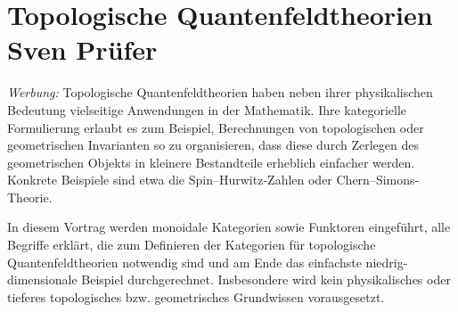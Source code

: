 \section[Topologische Quantenfeldtheorien]{Topologische Quantenfeldtheorien \hfill \small
Sven Prüfer}

\emph{Werbung:}
Topologische Quantenfeldtheorien haben neben ihrer physikalischen
Bedeutung vielseitige Anwendungen in der Mathematik. Ihre kategorielle
Formulierung erlaubt es zum Beispiel, Berechnungen von topologischen oder
geometrischen Invarianten so zu organisieren, dass diese durch Zerlegen
des geometrischen Objekts in kleinere Bestandteile erheblich einfacher
werden. Konkrete Beispiele sind etwa die Spin--Hurwitz-Zahlen oder
Chern--Simons-Theorie.

In diesem Vortrag werden monoidale Kategorien sowie Funktoren eingeführt,
alle Begriffe erklärt, die zum Definieren der Kategorien für topologische
Quantenfeldtheorien notwendig sind und am Ende das einfachste
niedrig-dimensionale Beispiel durchgerechnet. Insbesondere wird kein
physikalisches oder tieferes topologisches bzw. geometrisches Grundwissen
vorausgesetzt.

